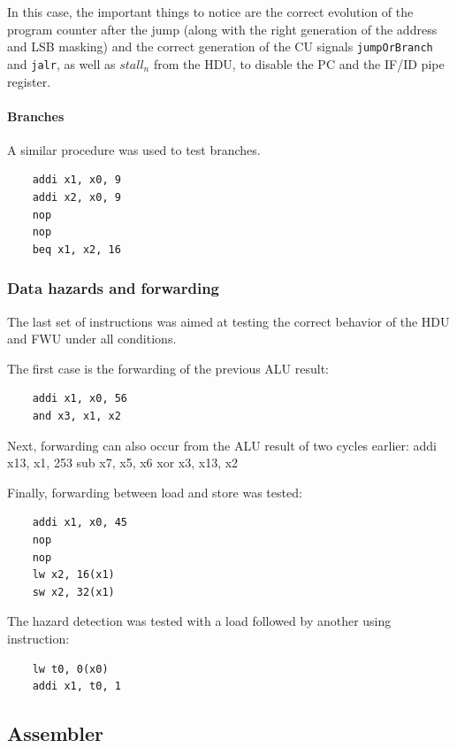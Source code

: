 \documentclass[a4paper]{article}
\begin{document}
In this case, the important things to notice are the correct evolution of the program counter after the jump (along with the right generation of the address and LSB masking) and the correct generation of the CU signals \texttt{jumpOrBranch} and \texttt{jalr}, as well as \texttt{$stall_n$} from the HDU, to disable the PC and the IF/ID pipe register.

\paragraph{Branches}
A similar procedure was used to test branches. 
\begin{verbatim}
    addi x1, x0, 9
    addi x2, x0, 9
    nop
    nop
    beq x1, x2, 16
\end{verbatim}

\subsubsection{Data hazards and forwarding}
The last set of instructions was aimed at testing the correct behavior of the HDU and FWU under all conditions.

The first case is the forwarding of the previous ALU result:
\begin{verbatim}
    addi x1, x0, 56
    and x3, x1, x2
\end{verbatim}

Next, forwarding can also occur from the ALU result of two cycles earlier:
addi x13, x1, 253
sub x7, x5, x6
xor x3, x13, x2

Finally, forwarding between load and store was tested:
\begin{verbatim}
    addi x1, x0, 45
    nop
    nop
    lw x2, 16(x1)
    sw x2, 32(x1)
\end{verbatim}

The hazard detection was tested with a load followed by another using instruction:
\begin{verbatim}
    lw t0, 0(x0)
    addi x1, t0, 1 
\end{verbatim}

\subsection{Assembler}\label{sec:assembler}
\end{document}
